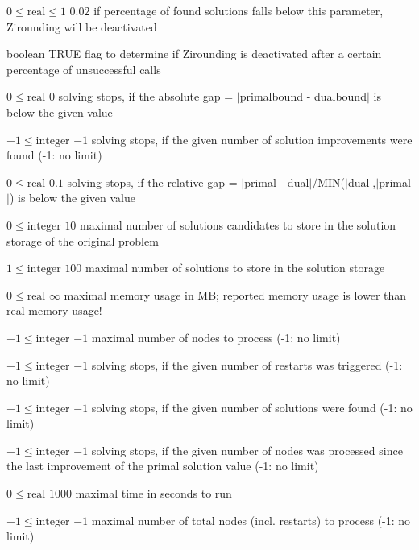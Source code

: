 %
{$0\leq\textrm{real}\leq1$}%
{$0.02$}%
{if percentage of found solutions falls below this parameter, Zirounding will be deactivated}%
{}

%
{boolean}%
{TRUE}%
{flag to determine if Zirounding is deactivated after a certain percentage of unsuccessful calls}%
{}

%
{$0\leq\textrm{real}$}%
{$0$}%
{solving stops, if the absolute gap = $|$primalbound - dualbound$|$ is below the given value}%
{}

%
{$-1\leq\textrm{integer}$}%
{$-1$}%
{solving stops, if the given number of solution improvements were found (-1: no limit)}%
{}

%
{$0\leq\textrm{real}$}%
{$0.1$}%
{solving stops, if the relative gap = $|$primal - dual$|$/MIN($|$dual$|$,$|$primal$|$) is below the given value}%
{}

%
{$0\leq\textrm{integer}$}%
{$10$}%
{maximal number of solutions candidates to store in the solution storage of the original problem}%
{}

%
{$1\leq\textrm{integer}$}%
{$100$}%
{maximal number of solutions to store in the solution storage}%
{}

%
{$0\leq\textrm{real}$}%
{$\infty$}%
{maximal memory usage in MB; reported memory usage is lower than real memory usage!}%
{}

%
{$-1\leq\textrm{integer}$}%
{$-1$}%
{maximal number of nodes to process (-1: no limit)}%
{}

%
{$-1\leq\textrm{integer}$}%
{$-1$}%
{solving stops, if the given number of restarts was triggered (-1: no limit)}%
{}

%
{$-1\leq\textrm{integer}$}%
{$-1$}%
{solving stops, if the given number of solutions were found (-1: no limit)}%
{}

%
{$-1\leq\textrm{integer}$}%
{$-1$}%
{solving stops, if the given number of nodes was processed since the last improvement of the primal solution value (-1: no limit)}%
{}

%
{$0\leq\textrm{real}$}%
{$1000$}%
{maximal time in seconds to run}%
{}

%
{$-1\leq\textrm{integer}$}%
{$-1$}%
{maximal number of total nodes (incl. restarts) to process (-1: no limit)}%
{}

